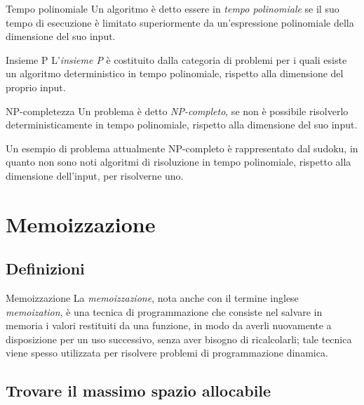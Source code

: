 \documentclass[a4paper, 12pt]{report}
\begin{document}
    \begin{frameddefn}{Tempo polinomiale}
        Un algoritmo è detto essere in \textit{tempo polinomiale} se il suo tempo di esecuzione è limitato superiormente da un'espressione polinomiale della dimensione del suo input.
    \end{frameddefn}

    \begin{frameddefn}{Insieme P}
        L'\textit{insieme P} è costituito dalla categoria di problemi per i quali esiste un algoritmo deterministico in tempo polinomiale, rispetto alla dimensione del proprio input.
    \end{frameddefn}

    \begin{frameddefn}{NP-completezza}
        Un problema è detto \textit{NP-completo}, se non è possibile risolverlo deterministicamente in tempo polinomiale, rispetto alla dimensione del suo input.
    \end{frameddefn}

    \begin{example}
        Un esempio di problema attualmente NP-completo è rappresentato dal sudoku, in quanto non sono noti algoritmi di risoluzione in tempo polinomiale, rispetto alla dimensione dell'input, per risolverne uno.
    \end{example}

    \section{Memoizzazione}

    \subsection{Definizioni}

    \begin{frameddefn}{Memoizzazione}
        La \textit{memoizzazione}, nota anche con il termine inglese \textit{memoization}, è una tecnica di programmazione che consiste nel salvare in memoria i valori restituiti da una funzione, in modo da averli nuovamente a disposizione per un uso successivo, senza aver bisogno di ricalcolarli; tale tecnica viene spesso utilizzata per risolvere problemi di programmazione dinamica.
    \end{frameddefn}

    \subsection{Trovare il massimo spazio allocabile}
\end{document}
